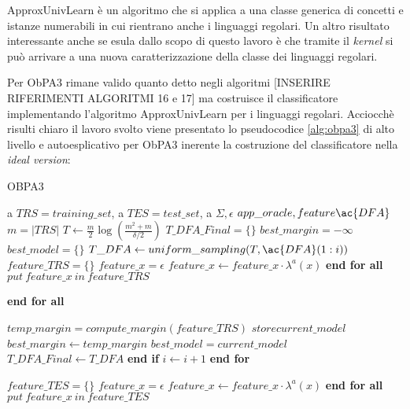 ApproxUnivLearn è un algoritmo che si applica a una classe generica di concetti e istanze numerabili in cui rientrano anche i linguaggi regolari. Un altro risultato interessante anche se esula dallo scopo di questo lavoro è che tramite il \textit{kernel} si può arrivare a una nuova caratterizzazione della classe dei linguaggi regolari.

Per \ac{ObPA3} rimane valido quanto detto negli algoritmi [INSERIRE RIFERIMENTI ALGORITMI 16 e 17] ma costruisce il classificatore implementando l'algoritmo ApproxUnivLearn per i linguaggi regolari. Acciocchè risulti chiaro il lavoro svolto viene presentato lo pseudocodice \ref{alg:obpa3} di alto livello e autoesplicativo per \ac{ObPA3} inerente la costruzione del classificatore nella \textit{ideal version}:

\begin{algorithm}
\caption{OBPA3}\label{alg:obpa3}
\begin{algorithmic}[1]
\Statex
\Input a $TRS = training\_set$, a $TES = test\_set$, a $\Sigma, \epsilon$   
\Output $app\_oracle , feature \ac{DFA}$
\State $m = |TRS|$ 
\State $T \gets \frac{m}{2}\log(\frac{m^{2}+m}{\delta/2})$ 
\State $T\_DFA\_Final = \{\}$ 
\State $best\_margin = -\infty$
\State $best\_model = \{\}$ 
   \State $T\_DFA \gets uniform\_sampling(T , \ac{DFA}(1:i))$ 
   \State $feature\_TRS = \{\}$ 
   \Statex
     \State $feature\_x =\epsilon $ 
          \State $feature\_x \gets feature\_x \cdot \lambda^{a}(x)$
      \EndFor
      \State \textbf{end for all}
      \State $put \: feature\_x \: in \: feature\_TRS$
      
   \EndFor
   \State \textbf{end for all}
\Statex

\State $temp\_margin = compute\_margin(feature\_TRS)$ 
\State $store current\_model$ 
\State $best\_margin \gets temp\_margin$
\State $best\_model = current\_model$
\State $T\_DFA\_Final \gets T\_DFA$
\State \textbf{end if}
\EndIf
\State $i \gets i+1$
\EndFor
\State \textbf{end for}


 \State $feature\_TES = \{\}$ 
     \State $feature\_x =\epsilon $ 
          \State $feature\_x \gets feature\_x \cdot \lambda^{a}(x)$
      \EndFor
      \State \textbf{end for all}
      \State $put \: feature\_x \: in \: feature\_TES$
      

\end{algorithmic}
\end{algorithm}
